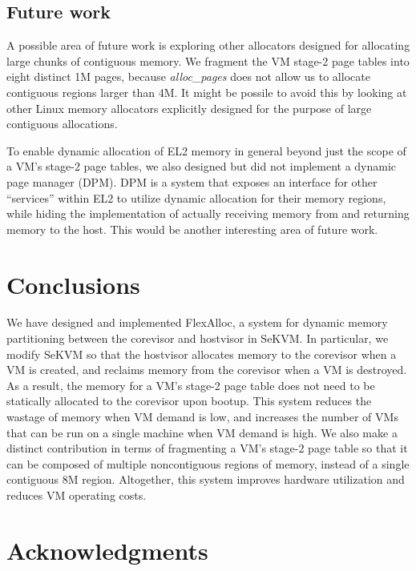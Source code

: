 \subsection{Future work}

A possible area of future work is exploring other allocators designed for
allocating large chunks of contiguous memory. We fragment the VM stage-2 page tables
into eight distinct 1M pages, because \textit{alloc\_pages} does not allow us
to allocate contiguous regions larger than 4M. It might be possile to avoid this
by looking at other Linux memory allocators explicitly designed for the purpose
of large contiguous allocations.

To enable dynamic allocation of EL2 memory in general beyond just the scope of
a VM's stage-2 page tables, we also designed but did not implement
a dynamic page manager (DPM). DPM is a system that exposes an interface for other ``services'' within EL2 to
utilize dynamic allocation for their memory regions, while hiding the implementation of actually receiving memory from
and returning memory to the host. This would be another interesting area of future work.

\section{Conclusions}

We have designed and implemented FlexAlloc, a system for dynamic memory
partitioning between the corevisor and hostvisor in SeKVM. In particular, we
modify SeKVM so that the hostvisor allocates memory to the corevisor when a VM is
created, and reclaims memory from the corevisor when a VM is destroyed. As a
result, the memory for a VM's stage-2 page table does not need to be statically
allocated to the corevisor upon bootup. This system reduces the wastage of memory
when VM demand is low, and increases the number of VMs that can be run
on a single machine when VM demand is high. We also make a distinct contribution in terms of fragmenting
a VM's stage-2 page table so that it can be composed of multiple noncontiguous
regions of memory, instead of a single contiguous 8M region. Altogether, this
system improves hardware utilization and reduces VM operating costs.

\section*{Acknowledgments}

